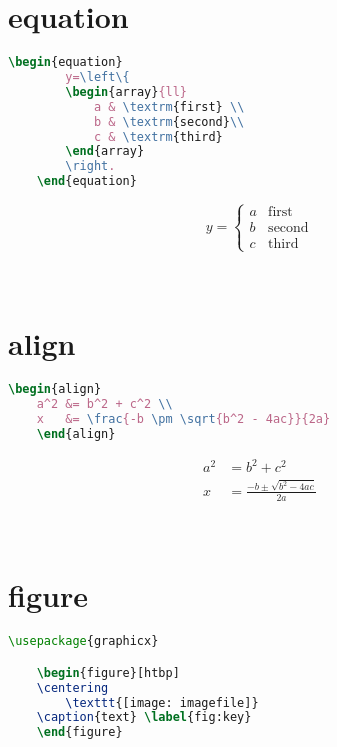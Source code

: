 \documentclass[11pt,a4paper]{article}
\begin{document}
\section{equation}
\begin{minipage}[c]{0.5\textwidth}
\begin{lstlisting}[language = TeX]
	\begin{equation}
		y=\left\{
		\begin{array}{ll}
			a & \textrm{first} \\
			b & \textrm{second}\\
			c & \textrm{third}
		\end{array} 
		\right.
	\end{equation}
\end{lstlisting}
\end{minipage}
\begin{minipage}[c]{0.4\textwidth}
	\begin{equation}
	y=\left\{
	\begin{array}{ll}
	a & \textrm{first} \\
	b & \textrm{second}\\
	c & \textrm{third}
	\end{array} 
	\right.
	\end{equation}		
\end{minipage}
\\[1em]
\section{align}
\begin{minipage}[c]{0.5\textwidth}
\begin{lstlisting}[language = TeX]
	\begin{align}
	a^2 &= b^2 + c^2 \\
	x   &= \frac{-b \pm \sqrt{b^2 - 4ac}}{2a} 
	\end{align}		
\end{lstlisting}
\end{minipage}
\begin{minipage}[c]{0.5\textwidth}
	\begin{align}
	a^2 &= b^2 + c^2 \\
	x &= \frac{-b \pm \sqrt{b^2 - 4ac}}{2a} 
	\end{align}		
\end{minipage}
\\[1em]
\section{figure}
\begin{lstlisting}[language = TeX]
\usepackage{graphicx}

	\begin{figure}[htbp]
	\centering
		\texttt{[image: imagefile]}
	\caption{text} \label{fig:key}
	\end{figure}
\end{lstlisting}
\end{document}
